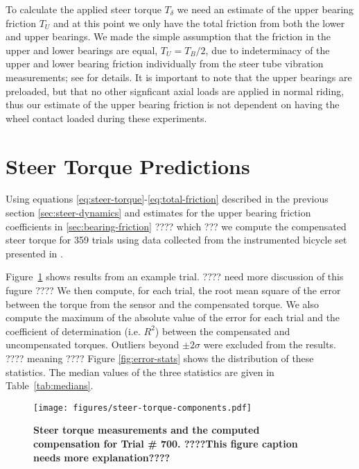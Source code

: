 \documentclass[10pt]{article}
\begin{document}
To calculate the applied steer torque $T_\delta$ we need an estimate of the
upper bearing friction $T_U$ and at this point we only have the total friction
from both the lower and upper bearings. We made the simple assumption that the
friction in the upper and lower bearings are equal, $T_U = T_B / 2$, due to
indeterminacy of the upper and lower bearing friction individually from the
steer tube vibration measurements; see \cite{Moore2012} for details. It is
important to note that the upper bearings are preloaded, but that no other
signficant axial loads are applied in normal riding, thus our estimate of the
upper bearing friction is not dependent on having the wheel contact loaded
during these experiments.


\section*{Steer Torque Predictions}

Using equations \ref{eq:steer-torque}-\ref{eq:total-friction} described in the
previous section \ref{sec:steer-dynamics} and estimates for the upper bearing
friction coefficients in \ref{sec:bearing-friction} ???? which ??? we compute
the compensated steer torque for 359 trials using data collected from the
instrumented bicycle set presented in \cite{Moore2012}.

Figure~\ref{fig:steer-torque-components} shows results from an example trial.
???? need more discussion of this fugure ????  We then compute, for each trial,
the root mean square of the error between the torque from the sensor and the
compensated torque. We also compute the maximum of the absolute value of the
error for each trial and the coefficient of determination (i.e. $R^2$) between
the compensated and uncompensated torques. Outliers beyond $\pm2 \sigma$ were
excluded from the results. ???? meaning ???? Figure \ref{fig:error-stats} shows
the distribution of these statistics. The median values of the three statistics
are given in Table~\ref{tab:medians}.

\begin{figure}
  \centering
  \texttt{[image: figures/steer-torque-components.pdf]}
  \caption{{\bf Steer torque measurements and the computed compensation for Trial \#
    700.  ????This figure caption needs more explanation????}}
  \label{fig:steer-torque-components}
\end{figure}
\end{document}
